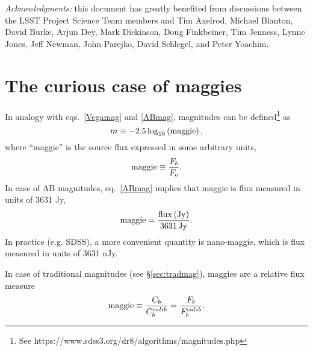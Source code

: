 \documentclass[DM,lsstdraft,toc,usenatbib]{lsstdoc}
\begin{document}
\vskip 0.0in
\newpage
{\it Acknowledgments:} this document has greatly benefited from discussions between
the LSST Project Science Team members and Tim Axelrod, Michael Blanton, David 
Burke, Arjun Dey, Mark Dickinson, Doug Finkbeiner, Tim Jenness, Lynne Jones,  Jeff Newman, 
John Parejko, David Schlegel, and Peter Yoachim. 


\appendix

\section{The curious case of maggies} 

In analogy with eqs.~\ref{Vegamag} and \ref{ABmag}, magnitudes can be defined\footnote{
See https://www.sdss3.org/dr8/algorithms/magnitudes.php} as 
\begin{equation}
\label{maggie}
               m \equiv - 2.5\log_{10}\left({\rm maggie}\right),
\end{equation}
where ``maggie'' is the source flux expressed in some arbitrary
units,
\begin{equation}
\label{maggie2}
               {\rm maggie} \equiv {F_b \over F_o}. 
\end{equation}
In case of AB magnitudes, eq.~\ref{ABmag} implies that maggie is 
flux measured in units of 3631 Jy, 
\begin{equation}
\label{eq:defmaggie} 
           {\rm maggie} = {{\rm flux \, (Jy)} \over {\rm 3631 \, Jy}}. 
\end{equation} 
In practice (e.g. SDSS), a more convenient
quantity is nano-maggie, which is flux measured in units of 3631 nJy.

In case of traditional magnitudes (see \S\ref{sec:tradmag}), maggies are a 
relative flux measure
\begin{equation}
\label{maggie3}
    {\rm maggie} \equiv {C_b  \over C_b^{calib}} = {F_b  \over F_b^{calib}}. 
\end{equation}
\end{document}
